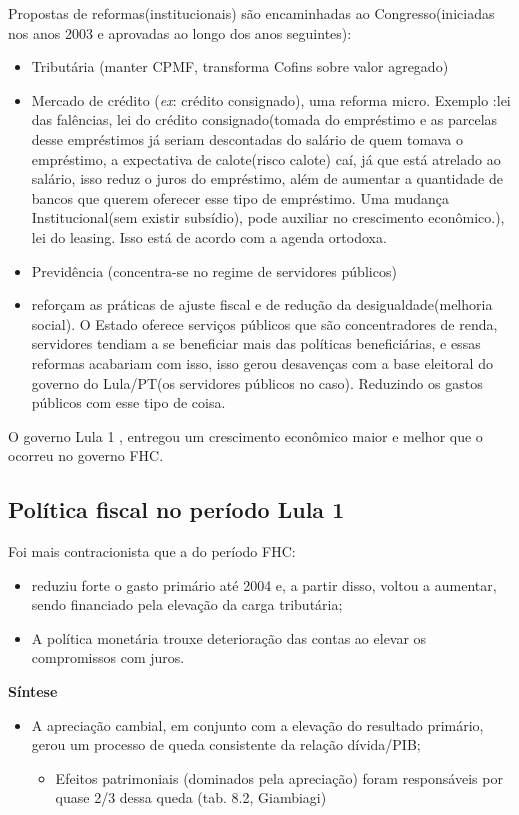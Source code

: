 \documentclass[a4paper,12pt]{article}[abntex2]
\begin{document}
Propostas de reformas(institucionais) são encaminhadas ao Congresso(iniciadas nos anos 2003 e aprovadas ao longo dos anos seguintes):
\begin{itemize}
    \item Tributária (manter CPMF, transforma Cofins sobre valor agregado)
    \item Mercado de crédito (\textit{ex}: crédito consignado), uma reforma micro. Exemplo :lei das falências, lei do crédito consignado(tomada do empréstimo e as parcelas desse empréstimos já seriam descontadas do salário de quem tomava o empréstimo, a expectativa de calote(risco calote) caí, já que está atrelado ao salário, isso reduz o juros do empréstimo, além de aumentar a quantidade de bancos que querem oferecer esse tipo de empréstimo. Uma mudança Institucional(sem existir subsídio), pode auxiliar no crescimento econômico.), lei do leasing. Isso está de acordo com a agenda ortodoxa.
    \item Previdência (concentra-se no regime de servidores públicos)
    \item reforçam as práticas de ajuste fiscal e de redução da desigualdade(melhoria social). O Estado oferece serviços públicos que são concentradores de renda, servidores tendiam a se beneficiar mais das políticas beneficiárias, e essas reformas acabariam com isso, isso gerou desavenças com a base eleitoral do governo do Lula/PT(os servidores públicos no caso). Reduzindo os gastos públicos com esse tipo de coisa.
\end{itemize}

O governo Lula 1 , entregou um crescimento econômico maior e melhor que o ocorreu no governo FHC. 

\subsection{\textbf{Política fiscal no período Lula 1}}
Foi mais contracionista que a do período FHC:

\begin{itemize}
    \item reduziu forte o gasto primário até 2004 e, a partir disso, voltou a aumentar, sendo financiado pela elevação da carga tributária;
    \item A política monetária trouxe deterioração das contas ao elevar os compromissos com juros.
\end{itemize}

\textbf{Síntese}
\begin{itemize}
    \item A apreciação cambial, em conjunto com a elevação do resultado primário, gerou um processo de queda consistente da relação dívida/PIB;
    \begin{itemize}
        \item Efeitos patrimoniais (dominados pela apreciação) foram responsáveis por quase 2/3 dessa queda (tab. 8.2, Giambiagi)
    \end{itemize}
\end{itemize}
\end{document}
